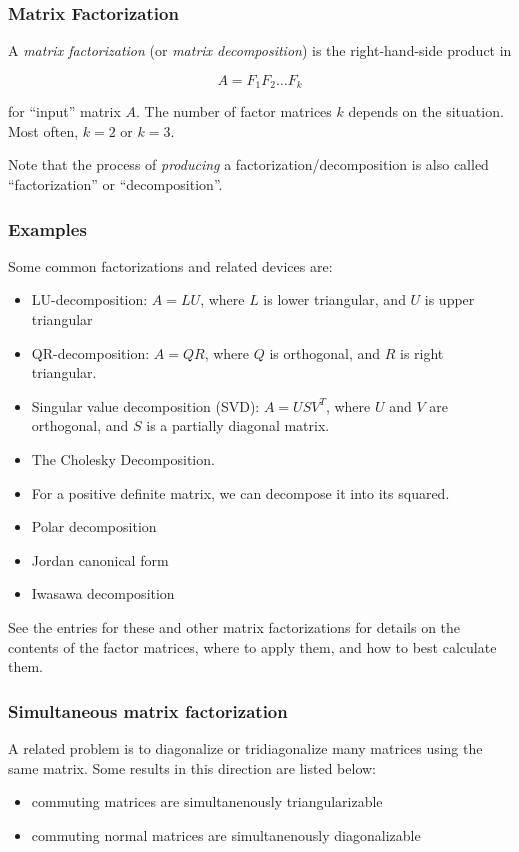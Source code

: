 \documentclass[12pt]{article}
\begin{document}
\subsubsection*{Matrix Factorization}

A \emph{matrix factorization} (or \emph{matrix decomposition}) is the right-hand-side product in

$$ A = F_1 F_2 \ldots F_k $$

for ``input'' matrix $A$.  The number of factor matrices $k$ depends on the situation.  Most often, $k = 2$ or $k = 3$.

Note that the process of \emph{producing} a factorization/decomposition is also called ``factorization'' or ``decomposition''.

\subsubsection*{Examples}

Some common factorizations and related devices are:

\begin{itemize}
\item LU-decomposition: $A = LU$, where $L$ is lower triangular, and $U$ is upper triangular
\item QR-decomposition: $A = QR$, where $Q$ is orthogonal, and $R$ is right triangular.
\item Singular value decomposition (SVD): $A = USV^T$, where $U$ and $V$ are orthogonal, and $S$ is a partially diagonal matrix.
\item The Cholesky Decomposition.
\item For a positive definite matrix, we can decompose it into its  squared.
\item Polar decomposition
\item Jordan canonical form
\item Iwasawa decomposition
\end{itemize}

See the entries for these and other matrix factorizations for details on the contents of the factor matrices, where to apply them, and how to best calculate them.

\subsubsection*{Simultaneous matrix factorization}
A related problem is to diagonalize or tridiagonalize many matrices using
the same matrix. Some results in this direction are listed below:
\begin{itemize}
\item commuting matrices are simultanenously triangularizable
\item commuting normal matrices are simultanenously diagonalizable
\end{itemize}
\end{document}
